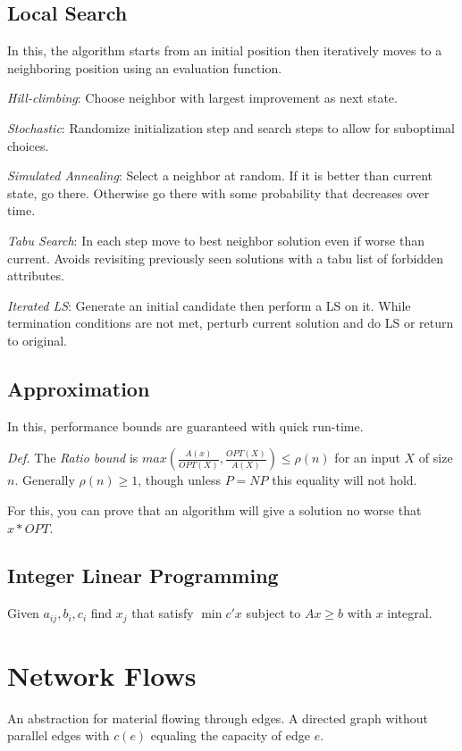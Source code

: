 \subsection*{Local Search}
In this, the algorithm starts from an initial position then iteratively moves to a neighboring position using an evaluation function. 

\textit{Hill-climbing}: Choose neighbor with largest improvement as next state.

\textit{Stochastic}: Randomize initialization step and search steps to allow for suboptimal choices. 

\textit{Simulated Annealing}: Select a neighbor at random. If it is better than current state, go there. Otherwise go there with some probability that decreases over time. 

\textit{Tabu Search}: In each step move to best neighbor solution even if worse than current. Avoids revisiting previously seen solutions with a tabu list of forbidden attributes. 

\textit{Iterated LS}: Generate an initial candidate then perform a LS on it. While termination conditions are not met, perturb current solution and do LS or return to original. 

\subsection*{Approximation}
In this, performance bounds are guaranteed with quick run-time.

\textit{Def.} The \textit{Ratio bound} is $max\left( \frac{A(x)}{OPT(X)},\frac{OPT(X)}{A(X)}\right) \leq \rho(n)$ for an input $X$ of size $n$. Generally $\rho(n) \geq 1$, though unless $P = NP$ this equality will not hold. 

For this, you can prove that an algorithm will give a solution no worse that $x*OPT$. 

\subsection*{Integer Linear Programming}
Given $a_{ij}, b_i, c_i$ find $x_j$ that satisfy $\min c'x$ subject to $Ax \geq b$ with $x$ integral. 

\section*{Network Flows}
An abstraction for material flowing through edges. A directed graph without parallel edges with $c(e)$ equaling the capacity of edge $e$.  

